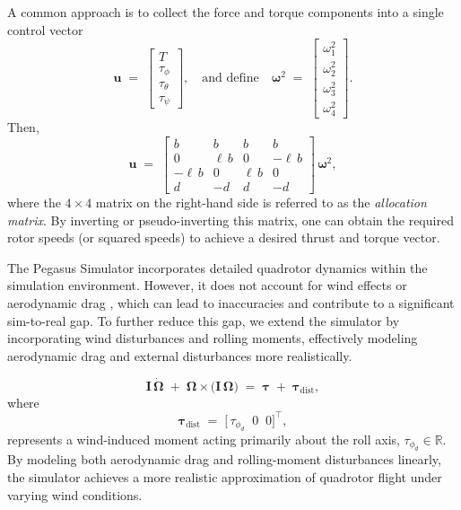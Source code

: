 \documentclass[12pt,twoside,letterpaper]{article}
\begin{document}
A common approach is to collect the force and torque components into a single control vector
\begin{equation}
    \mathbf{u}
    \;=\;
    \begin{bmatrix}
    T \\[4pt]
    \tau_{\phi} \\[3pt]
    \tau_{\theta} \\[3pt]
    \tau_{\psi}
    \end{bmatrix},
    \quad
    \text{and define}
    \quad
    \boldsymbol{\omega}^2
    \;=\;
    \begin{bmatrix}
    \omega_1^2 \\[4pt]
    \omega_2^2 \\[4pt]
    \omega_3^2 \\[4pt]
    \omega_4^2
    \end{bmatrix}.
\end{equation}
Then,
\begin{equation}
    \mathbf{u} 
    \;=\;
    \begin{bmatrix}
    b & b & b & b \\
    0 & \ell\,b & 0 & -\ell\,b \\
    -\ell\,b & 0 & \ell\,b & 0 \\
    d & -d & d & -d
    \end{bmatrix}
    \,\boldsymbol{\omega}^2,
    \label{eq:allocation_matrix}
\end{equation}
where the $4\times4$ matrix on the right-hand side is referred to as the \emph{allocation matrix}. By inverting or pseudo-inverting this matrix, one can obtain the required rotor speeds (or squared speeds) to achieve a desired thrust and torque vector.

The Pegasus Simulator incorporates detailed quadrotor dynamics within the simulation environment. However, it does not account for wind effects or aerodynamic drag \cite{martin2010true}, which can lead to inaccuracies and contribute to a significant sim-to-real gap. To further reduce this gap, we extend the simulator by incorporating wind disturbances and rolling moments, effectively modeling aerodynamic drag and external disturbances more realistically.

\begin{equation}
    \mathbf{I}\,\dot{\boldsymbol{\Omega}}
    \;+\;
    \boldsymbol{\Omega} \times \bigl(\mathbf{I}\,\boldsymbol{\Omega}\bigr)
    \;=\;
    \boldsymbol{\tau}
    \;+\;
    \boldsymbol{\tau}_{\mathrm{dist}},
    \label{eq:rotational_disturbance}
\end{equation}
where
\begin{equation}
    \boldsymbol{\tau}_{\mathrm{dist}}
    \;=\;
    \bigl[\,
    \tau_{\phi_d}
    \;\;0\;\;0
    \bigr]^\top,
\end{equation}
represents a wind-induced moment acting primarily about the roll axis, $\tau_{\phi_d}\in \mathbb{R}$. 
By modeling both aerodynamic drag and rolling-moment disturbances linearly, the simulator achieves a more realistic approximation of quadrotor flight under varying wind conditions.
\end{document}
